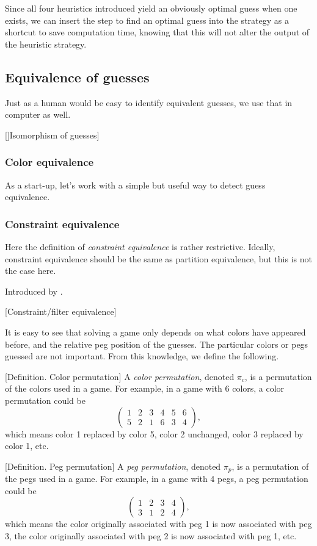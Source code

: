 Since all four heuristics introduced yield an obviously optimal guess when one exists, we can insert the step to find an optimal guess into the strategy as a shortcut to save computation time, knowing that this will not alter the output of the heuristic strategy.

\subsection{Equivalence of guesses}

Just as a human would be easy to identify equivalent guesses, we use that in computer as well.

[]Isomorphism of guesses]

\subsubsection{Color equivalence}

As a start-up, let's work with a simple but useful way to detect guess equivalence.

\subsubsection{Constraint equivalence}

Here the definition of \emph{constraint equivalence} is rather restrictive. Ideally, constraint equivalence should be the same as partition equivalence, but this is not the case here.

Introduced by \cite{neuwirth81,koyama93}. 

[Constraint/filter equivalence]

It is easy to see that solving a game only depends on what colors have appeared before, and the relative peg position of the guesses. The particular colors or pegs guessed are not important. From this knowledge, we define the following.

[Definition. Color permutation] A \emph{color permutation}, denoted $\pi_c$, is a permutation of the colors used in a game. For example, in a game with 6 colors, a color permutation could be
\[
\begin{pmatrix}
1 & 2 & 3 & 4 & 5 & 6 \\
5 & 2 & 1 & 6 & 3 & 4
\end{pmatrix} ,
\]
which means color 1 replaced by color 5, color 2 unchanged, color 3 replaced by color 1, etc.

[Definition. Peg permutation] A \emph{peg permutation}, denoted $\pi_p$, is a permutation of the pegs used in a game. For example, in a game with 4 pegs, a peg permutation could be
\[
\begin{pmatrix}
1 & 2 & 3 & 4 \\
3 & 1 & 2 & 4
\end{pmatrix} ,
\]
which means the color originally associated with peg 1 is now associated with peg 3, the color originally associated with peg 2 is now associated with peg 1, etc.

